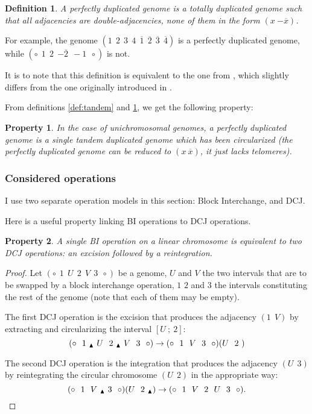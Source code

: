 \documentclass[11pt,final,twoside,nofrench]{thlifl}
\newcommand{\snd}[1]{ \ensuremath{\overline{#1}} }
\newcommand{\msnd}[1]{ \ensuremath{{-\overline{#1}}} }
\newcommand{\breakpoint}{ \textsubscript{$\textcolor{black}{\blacktriangle}$} }
\newtheorem{property}{Property}
\newtheorem{proof}{Proof}
\newtheorem{definition}{Definition}
\begin{document}
\begin{definition}
\label{def:perfectly}
A \emph{perfectly duplicated genome} is a totally duplicated genome such that
all adjacencies are double-adjacencies, none of them in the form $(x~\msnd{x})$.
\end{definition}

For example, the genome $(1~~{2}~~{3}~~4~~\snd{1}~~\snd{2}~~\snd{3}~~\snd{4})$
is a perfectly duplicated genome, while $(\circ~~1~~2~~\msnd{2}~~-1~~\circ)$ is not.

It is to note that this definition is equivalent to the one from \cite{Mixtacki08}, which slightly differs from the one originally introduced in \cite{Warren08}.

From definitions \ref{def:tandem} and \ref{def:perfectly}, we get the following property:

\begin{property}
    \label{prop:dtdp}
    In the case of
    unichromosomal genomes, a perfectly duplicated genome is a single
    tandem duplicated genome which has been circularized (the
    perfectly duplicated genome can be reduced to $(x~\snd{x})$, it
    just lacks telomeres).
\end{property}

\subsubsection{Considered operations}

I use two separate operation models in this section: Block Interchange, and DCJ.

Here is a useful property linking BI operations to DCJ operations.

\begin{property}
\label{1BIto2DCJ}
A single BI operation on a linear chromosome is equivalent to two DCJ operations: an excision followed by a reintegration.
\end{property}

\begin{proof}
Let $(\circ~~1~~U~~2~~V~~3~~\circ)$ be a genome, $U$ and $V$ the two intervals 
that are to be swapped by a block interchange operation, $1$ $2$ and $3$ the 
intervals constituting the rest of the genome (note that each of them may be 
empty). 

The first DCJ operation is the excision that produces the adjacency
$(1~~V)$ by extracting and circularizing the interval $[U~;~2]$: 
$$(\circ~~1~\breakpoint~U~~2~\breakpoint~V~~3~~\circ) \rightarrow
(\circ~~1~~V~~3~~\circ)(U~~2~)$$

The second DCJ operation is the integration that produces the adjacency
$(U~~3)$ by reintegrating the circular chromosome $(U~~2)$ in the
appropriate way:
$$(\circ~~1~~V~\breakpoint~3~~\circ)(U~~2~\breakpoint) \rightarrow (\circ~~1~~V~~2~~U~~3~~\circ).$$
\end{proof}
\end{document}
